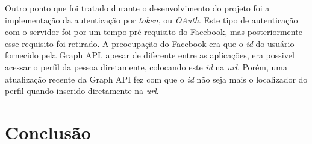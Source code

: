 \documentclass[
	12pt,				%
	oneside,			%
	a4paper,			%
	english,			%
	brazil				%
	]{abntex2ppgsi}
\begin{document}
Outro ponto que foi tratado durante o desenvolvimento do projeto foi a implementação da autenticação por \textit{token}, ou \textit{OAuth}. Este tipo de autenticação com o servidor foi por um tempo pré-requisito do Facebook, mas posteriormente esse requisito foi retirado. A preocupação do Facebook era que o \textit{id} do usuário fornecido pela Graph API, apesar de diferente entre as aplicações, era possivel acessar o perfil da pessoa diretamente, colocando este \textit{id} na \textit{url}. Porém, uma atualização recente da Graph API fez com que o \textit{id} não seja mais o localizador do perfil quando inserido diretamente na \textit{url}.

\chapter{Conclusão}

\postextual



%
%

\end{document}
